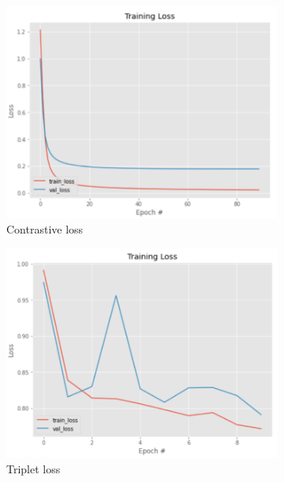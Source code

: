 \begin{figure}[h]
  \centering
  \begin{subfigure}[b]{0.48\linewidth}
  \includegraphics[width=\linewidth]{figs/con_loss.png}
  \caption{Contrastive loss}
  \label{fig:con_loss}
  \end{subfigure}
  \hfill
   \begin{subfigure}[b]{0.48\linewidth}
   \includegraphics[width=\linewidth]{figs/tri_loss.png}
   \caption{Triplet loss}
   \label{fig:tri_loss}
  \end{subfigure}
    \hfill
    \begin{subfigure}[b]{0.48\linewidth}

\end{subfigure}
\end{figure}
